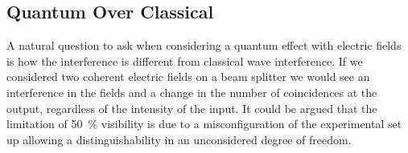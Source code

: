 %
%
%
%

\subsection{Quantum Over Classical}

A natural question to ask when considering a quantum effect with electric fields is how the interference is different from classical wave interference. If we considered two coherent electric fields on a beam splitter we would see an interference in the fields and a change in the number of coincidences at the output, regardless of the intensity of the input. It could be argued that the limitation of \SI{50}{\percent} visibility is due to a misconfiguration of the experimental set up allowing a distinguishability in an unconsidered degree of freedom.

